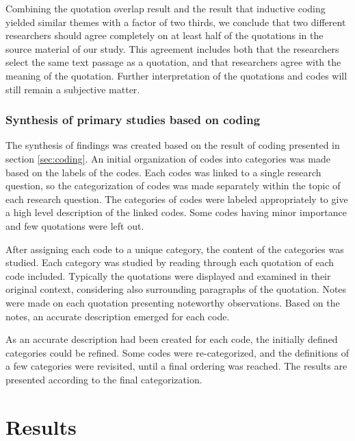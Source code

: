 Combining the quotation overlap result and the result that inductive coding
yielded similar themes with a factor of two thirds, we conclude that two
different researchers should agree completely on at least half of the quotations
in the source material of our study. This agreement includes both that the
researchers select the same text passage as a quotation, and that researchers
agree with the meaning of the quotation. Further interpretation of the
quotations and codes will still remain a subjective matter.


\subsection{Synthesis of primary studies based on coding}

The synthesis of findings was created based on the result of coding presented in
section \ref{sec:coding}. An initial organization of codes into categories was
made based on the labels of the codes. Each codes was linked to a single
research question, so the categorization of codes was made separately within
the topic of each research question. The categories of codes were labeled
appropriately to give a high level description of the linked codes. Some codes
having minor importance and few quotations were left out.

After assigning each code to a unique category, the content of the categories
was studied. Each category was studied by reading through each quotation of each
code included. Typically the quotations were displayed and examined in their
original context, considering also surrounding paragraphs of the quotation.
Notes were made on each quotation presenting noteworthy observations. Based on
the notes, an accurate description emerged for each code.

As an accurate description had been created for each code, the initially defined
categories could be refined. Some codes were re-categorized, and the definitions
of a few categories were revisited, until a final ordering was reached. The
results are presented according to the final categorization.



\clearpage

\chapter{Results}
\label{sec:results}

